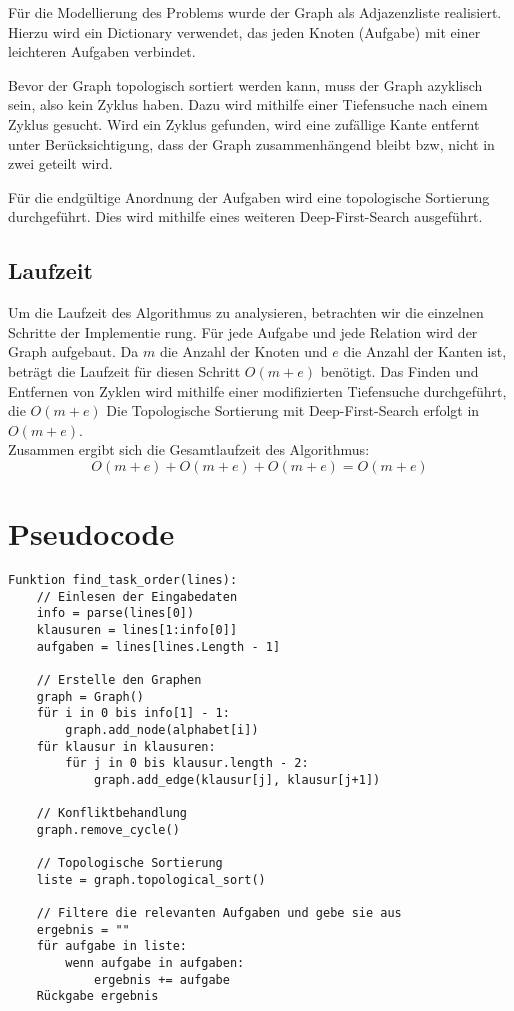 \documentclass[a4paper,10pt,ngerman]{scrartcl}
\begin{document}
Für die Modellierung des Problems wurde der Graph als Adjazenzliste realisiert. Hierzu wird ein Dictionary verwendet, das jeden Knoten (Aufgabe) mit einer leichteren Aufgaben verbindet.

Bevor der Graph topologisch sortiert werden kann, muss der Graph azyklisch sein, also kein Zyklus haben. Dazu wird mithilfe einer Tiefensuche nach einem Zyklus gesucht. Wird ein Zyklus gefunden, wird eine zufällige Kante entfernt unter Berücksichtigung, dass der Graph zusammenhängend bleibt bzw, nicht in zwei geteilt wird.

Für die endgültige Anordnung der Aufgaben wird eine topologische Sortierung durchgeführt. Dies wird mithilfe eines weiteren Deep-First-Search ausgeführt.

\subsection{Laufzeit}
Um die Laufzeit des Algorithmus zu analysieren, betrachten wir die einzelnen Schritte der Implementie
rung.
Für jede Aufgabe und jede Relation wird der Graph aufgebaut. Da $m$ die Anzahl der Knoten und $e$ die Anzahl der Kanten ist, beträgt die Laufzeit für diesen Schritt $O(m+e)$ benötigt.
Das Finden und Entfernen von Zyklen wird mithilfe einer modifizierten Tiefensuche durchgeführt, die $O(m+e)$
Die Topologische Sortierung mit Deep-First-Search erfolgt in $O(m+e)$.\\
Zusammen ergibt sich die Gesamtlaufzeit des Algorithmus:
$$
O(m+e)+O(m+e)+O(m+e)=O(m+e)
$$

\newpage
\section{Pseudocode}
\begin{verbatim}
Funktion find_task_order(lines):
    // Einlesen der Eingabedaten
    info = parse(lines[0])
    klausuren = lines[1:info[0]]
    aufgaben = lines[lines.Length - 1]

    // Erstelle den Graphen
    graph = Graph()
    für i in 0 bis info[1] - 1:
        graph.add_node(alphabet[i])
    für klausur in klausuren:
        für j in 0 bis klausur.length - 2:
            graph.add_edge(klausur[j], klausur[j+1])

    // Konfliktbehandlung
    graph.remove_cycle()

    // Topologische Sortierung
    liste = graph.topological_sort()

    // Filtere die relevanten Aufgaben und gebe sie aus
    ergebnis = ""
    für aufgabe in liste:
        wenn aufgabe in aufgaben:
            ergebnis += aufgabe
    Rückgabe ergebnis

\end{verbatim}
\end{document}
